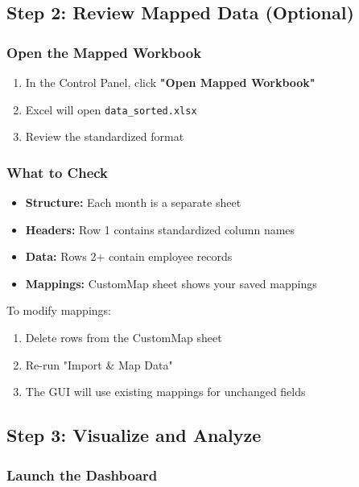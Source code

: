 \documentclass[11pt,a4paper]{article}
\begin{document}
\subsection{Step 2: Review Mapped Data (Optional)}

\subsubsection{Open the Mapped Workbook}

\begin{enumerate}[leftmargin=*]
    \item In the Control Panel, click \textbf{"Open Mapped Workbook"}
    \item Excel will open \texttt{data\_sorted.xlsx}
    \item Review the standardized format
\end{enumerate}

\subsubsection{What to Check}

\begin{itemize}[leftmargin=*]
    \item \textbf{Structure:} Each month is a separate sheet
    \item \textbf{Headers:} Row 1 contains standardized column names
    \item \textbf{Data:} Rows 2+ contain employee records
    \item \textbf{Mappings:} CustomMap sheet shows your saved mappings
\end{itemize}

\begin{infobox}[title=Editing Mappings]
To modify mappings:
\begin{enumerate}
    \item Delete rows from the CustomMap sheet
    \item Re-run "Import \& Map Data"
    \item The GUI will use existing mappings for unchanged fields
\end{enumerate}
\end{infobox}

\subsection{Step 3: Visualize and Analyze}

\subsubsection{Launch the Dashboard}
\end{document}
